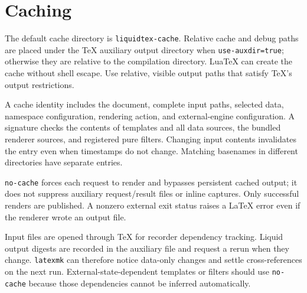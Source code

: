 \section{Caching}
\label{sec:caching}

The default cache directory is \texttt{liquidtex-cache}. Relative cache and debug
paths are placed under the TeX auxiliary output directory when
\texttt{use-auxdir=true}; otherwise they are relative to the compilation directory.
LuaTeX can create the cache without shell escape. Use relative, visible output
paths that satisfy TeX's output restrictions.

A cache identity includes the document, complete input paths, selected data,
namespace configuration, rendering action, and external-engine configuration.
A signature checks the contents of templates and all data sources, the bundled
renderer sources, and registered pure filters. Changing input contents invalidates
the entry even when timestamps do not change. Matching basenames in different
directories have separate entries.

\texttt{no-cache} forces each request to render and bypasses persistent cached
output; it does not suppress auxiliary request/result files or inline captures.
Only successful renders are published. A nonzero external exit status raises a
LaTeX error even if the renderer wrote an output file.

Input files are opened through TeX for recorder dependency tracking. Liquid output
digests are recorded in the auxiliary file and request a rerun when they change.
\texttt{latexmk} can therefore notice data-only changes and settle cross-references
on the next run. External-state-dependent templates or filters should use
\texttt{no-cache} because those dependencies cannot be inferred automatically.
